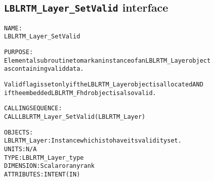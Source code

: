 \subsection{\texttt{LBLRTM\_Layer\_SetValid} interface}
  \label{sec:LBLRTM_Layer_SetValid_interface}
  \begin{alltt}
 
  NAME:
        LBLRTM_Layer_SetValid
 
  PURPOSE:
        Elemental subroutine to mark an instance of an LBLRTM_Layer object
        as containing valid data.
 
        Valid flag is set only if the LBLRTM_Layer object is allocated AND
        if the embedded LBLRTM_Fhdr object is also valid.
 
  CALLING SEQUENCE:
        CALL LBLRTM_Layer_SetValid( LBLRTM_Layer )
 
  OBJECTS:
        LBLRTM_Layer:  Instance which is to have its validity set.
                       UNITS:      N/A
                       TYPE:       LBLRTM_Layer_type
                       DIMENSION:  Scalar or any rank
                       ATTRIBUTES: INTENT(IN)
 
  \end{alltt}
